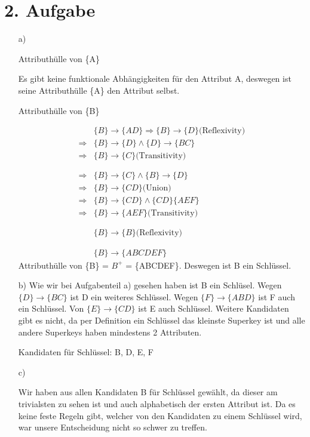 \begin{enumerate}
\end{enumerate}

\section*{2. Aufgabe}

\begin{enumerate}

\item[a)]

Attributhülle von \{A\}

Es gibt keine funktionale Abhängigkeiten für den Attribut A, deswegen ist seine Attributhülle \{A\} den Attribut selbst. 

Attributhülle von \{B\}

\begin{align*}
& \{B\} \rightarrow \{AD\} \Rightarrow \{B\} \rightarrow \{D\} \text{(Reflexivity)} \\
\Rightarrow & \{B\} \rightarrow \{D\} \land \{D\} \rightarrow \{BC\} \\
\Rightarrow & \{B\} \rightarrow \{C\} \text{(Transitivity)} \\ \\ \\
%
\Rightarrow & \{B\} \rightarrow \{C\} \land \{B\} \rightarrow \{D\} \\
\Rightarrow & \{B\} \rightarrow \{CD\} \text{(Union)} \\
\Rightarrow & \{B\} \rightarrow \{CD\} \land \{CD\} \{AEF\} \\
\Rightarrow & \{B\} \rightarrow \{AEF\} \text{(Transitivity)} \\ \\ \\
%
& \{B\} \rightarrow \{B\} \text{(Reflexivity)} \\ \\ \\
%
& \{B\} \rightarrow \{ABCDEF\}
\end{align*}
Attributhülle von \{B\} = $B^{+}$ = \{ABCDEF\}. Deswegen ist B ein Schlüssel. 

\item[b)]
Wie wir bei Aufgabenteil a) gesehen haben ist B ein Schlüsel.
Wegen $\{D\} \rightarrow \{BC\}$ ist D ein weiteres Schlüssel. Wegen $\{F\} \rightarrow \{ABD\}$ ist F auch ein Schlüssel. Von $\{E\} \rightarrow \{CD\}$ ist E auch Schlüssel. Weitere Kandidaten gibt es nicht, da per Definition ein Schlüssel das kleinste Superkey ist und alle andere Superkeys haben mindestens 2 Attributen.

Kandidaten für Schlüssel: B, D, E, F

\item[c)]

Wir haben aus allen Kandidaten B für Schlüssel gewählt, da dieser am trivialsten zu sehen ist und auch alphabetisch der ersten Attribut ist. Da es keine feste Regeln gibt, welcher von den Kandidaten zu einem Schlüssel wird, war unsere Entscheidung nicht so schwer zu treffen.

\end{enumerate}

